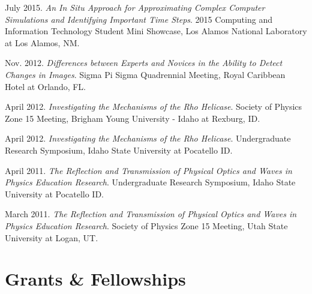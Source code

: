 \documentclass[11pt, letterpaper, roman]{moderncv} %
\begin{document}
\begin{etaremune}[topsep=0pt, itemsep=5pt, partopsep=0pt, parsep=0pt]
  \item July 2015. \textit{An In Situ Approach for Approximating Complex Computer Simulations and Identifying Important Time Steps}. 2015 Computing and Information Technology Student Mini Showcase, Los Alamos National Laboratory at Los Alamos, NM.

  \item Nov. 2012. \textit{Differences between Experts and Novices in the Ability to Detect Changes in Images}. Sigma Pi Sigma Quadrennial Meeting, Royal Caribbean Hotel at Orlando, FL.

  \item April 2012. \textit{Investigating the Mechanisms of the Rho Helicase}. Society of Physics Zone 15 Meeting, Brigham Young University - Idaho at Rexburg, ID.

  \item April 2012. \textit{Investigating the Mechanisms of the Rho Helicase}. Undergraduate Research Symposium, Idaho State University at Pocatello ID.

  \item April 2011. \textit{The Reflection and Transmission of Physical Optics and Waves in Physics Education Research}. Undergraduate Research Symposium, Idaho State University at Pocatello ID.

  \item March 2011. \textit{The Reflection and Transmission of Physical Optics and Waves in Physics Education Research}. Society of Physics Zone 15 Meeting, Utah State University at Logan, UT.
\end{etaremune}



\section{Grants \& Fellowships}
    \vspace{2pt}
    
\end{document}
